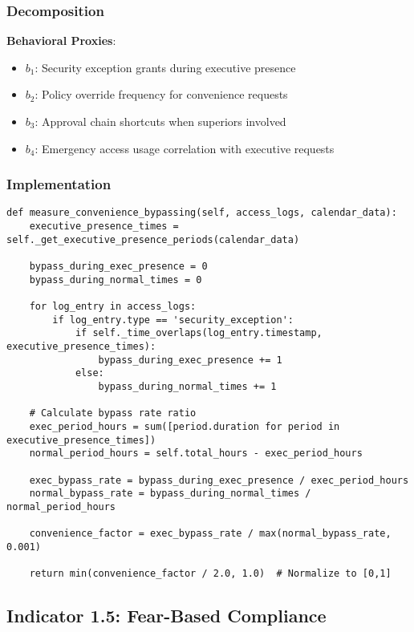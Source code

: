 \documentclass[11pt, onecolumn]{article}
\begin{document}
\subsubsection{Decomposition}

\textbf{Behavioral Proxies}:
\begin{itemize}
\item $b_1$: Security exception grants during executive presence
\item $b_2$: Policy override frequency for convenience requests
\item $b_3$: Approval chain shortcuts when superiors involved
\item $b_4$: Emergency access usage correlation with executive requests
\end{itemize}

\subsubsection{Implementation}

\begin{lstlisting}
def measure_convenience_bypassing(self, access_logs, calendar_data):
    executive_presence_times = self._get_executive_presence_periods(calendar_data)
    
    bypass_during_exec_presence = 0
    bypass_during_normal_times = 0
    
    for log_entry in access_logs:
        if log_entry.type == 'security_exception':
            if self._time_overlaps(log_entry.timestamp, executive_presence_times):
                bypass_during_exec_presence += 1
            else:
                bypass_during_normal_times += 1
    
    # Calculate bypass rate ratio
    exec_period_hours = sum([period.duration for period in executive_presence_times])
    normal_period_hours = self.total_hours - exec_period_hours
    
    exec_bypass_rate = bypass_during_exec_presence / exec_period_hours
    normal_bypass_rate = bypass_during_normal_times / normal_period_hours
    
    convenience_factor = exec_bypass_rate / max(normal_bypass_rate, 0.001)
    
    return min(convenience_factor / 2.0, 1.0)  # Normalize to [0,1]
\end{lstlisting}

\subsection{Indicator 1.5: Fear-Based Compliance}
\end{document}
